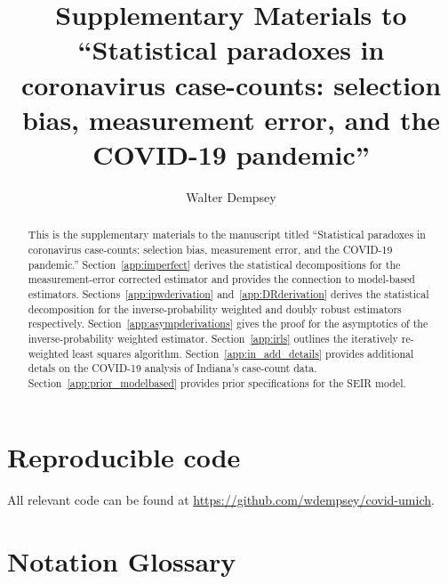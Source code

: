 \documentclass[12pt]{amsart}
\numberwithin{equation}{section}
\theoremstyle{plain}
\begin{document}
\title[Statistical paradoxes in coronavirus case-counts]{Supplementary Materials to ``Statistical paradoxes in coronavirus case-counts: selection bias, measurement error, and the COVID-19 pandemic''} %

\author{Walter Dempsey}
\address{Department of Biostatistics, University of Michigan, Ann Arbor, MI 48109}

\begin{abstract}
This is the supplementary materials to the manuscript titled ``Statistical paradoxes in coronavirus case-counts: selection bias, measurement error, and the COVID-19 pandemic.''  Section~\ref{app:imperfect} derives the statistical decompositions for the measurement-error corrected estimator and provides the connection to model-based estimators. Sections~\ref{app:ipwderivation} and~\ref{app:DRderivation} derives the statistical decomposition for the inverse-probability weighted and doubly robust estimators respectively.
Section~\ref{app:asympderivations} gives the proof for the asymptotics of the inverse-probability weighted estimator.  
Section~\ref{app:irls} outlines the iteratively re-weighted least squares algorithm.
Section~\ref{app:in_add_details} provides additional detals on the COVID-19 analysis of Indiana's case-count data.
Section~\ref{app:prior_modelbased} provides prior specifications for the SEIR model.
\end{abstract}

\maketitle

\newpage
\appendix

\section{Reproducible code}

All relevant code can be found at \url{https://github.com/wdempsey/covid-umich}.

\section{Notation Glossary}
\label{app:notation}
\end{document}

